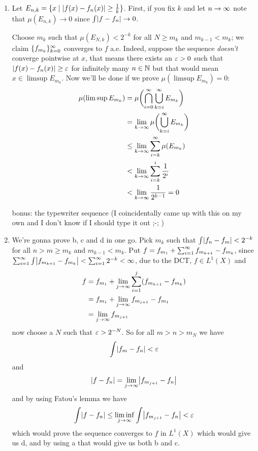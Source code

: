 \documentclass{article}
\begin{document}
\begin{homeworkProblem}
    \begin{enumerate}[label=\alph*.]
        \item Let $E_{n, k}=\{x\mid \abs{f(x)-f_n(x)}\geq \frac{1}{k}\}$. First, if you fix $k$ and let $n\to\infty$ note that $\mu(E_{n, k})\to 0$ since $\int\abs{f-f_n}\to 0$.
        
        Choose $m_k$ such that $\mu(E_{N, k})<2^{-k}$ for all $N\geq m_k$ and $m_{k-1}<m_k$; we claim $\{f_{m_k}\}_{k=0}^\infty$ converges to $f$ a.e. Indeed, suppose the sequence \emph{doesn't} converge pointwise at $x$, that means there exists an $\varepsilon>0$ such that $\abs{f(x)-f_n(x)}\geq \eps$ for infinitely many $n\in\mathbb{N}$ but that would mean $x\in \limsup E_{m_k}$. Now we'll be done if we prove $\mu(\limsup E_{m_k})=0$:
        \begin{align*}
            \mu(\limsup E_{m_k}) &= \mu\biggl(\bigcap_{i=0}^\infty\bigcup_{k=i}^\infty E_{m_k}\biggr) \\
            &= \lim_{k\to\infty}\mu\biggl(\bigcup_{k=i}^\infty E_{m_k}\biggr) \\
            &\leq \lim_{k\to\infty}\sum_{i=k}^\infty\mu(E_{m_k}) \\
            &< \lim_{k\to\infty}\sum_{i=k}^i\frac{1}{2^i} \\
            &< \lim_{k\to\infty} \frac{1}{2^{k-1}} = 0
        \end{align*}

        bonus: the typewriter sequence (I coincidentally came up with this on my own and I don't know if I should type it out ;-; )
        \item We're gonna prove b, c and d in one go. Pick $m_k$ such that $\int \abs{f_n-f_m}<2^{-k}$ for all $n>m\geq m_k$ and $m_{k-1}<m_k$. Put $f=f_{m_1}+\sum_{i=1}^\infty f_{m_{k+1}}-f_{m_k}$, since $\sum_{i=1}^\i\int \abs{f_{m_{k+1}}-f_{m_k}}<\sum_{i=1}^\i 2^{-k}<\i$, due to the DCT, $f\in L^1(X)$ and
        \begin{align*}
            f &= f_{m_1}+\lim_{j\to\infty}\sum_{i=1}^j (f_{m_{k+1}}-f_{m_k}) \\
            &= f_{m_1}+\lim_{j\to\infty} f_{m_{j+1}} - f_{m_1} \\
            &= \lim_{j\to\infty} f_{m_{j+1}}
        \end{align*}
        now choose a $N$ such that $\varepsilon>2^{-N}$. So for all $m>n>m_N$ we have
        \[
            \int\abs{f_m-f_n}<\eps
        \]
        and
        \[
            \abs{f-f_n}=\lim_{j\to\i}\abs{f_{m_{j+1}}-f_n}
        \]
        and by using Fatou's lemma we have
        \[
            \int \abs{f-f_n}\leq \liminf_{j\to\i}\int \abs{f_{m_{j+1}}-f_n} < \eps
        \]
        which would prove the sequence converges to $f$ in $L^1(X)$ which would give us d, and by using a that would give us both b and c.
    \end{enumerate}
\end{homeworkProblem}
\end{document}
